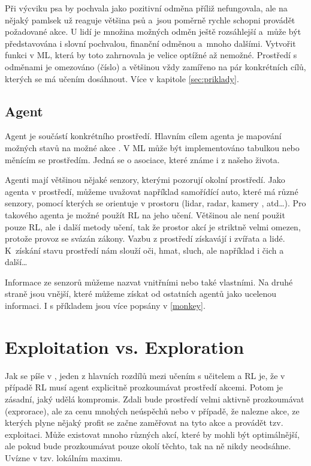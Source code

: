 \documentclass{article}
\begin{document}
Při výcviku psa by pochvala jako pozitivní odměna příliž nefungovala, ale na nějaký pamlsek už reaguje většina psů a~jsou poměrně rychle schopni provádět požadované akce. U lidí je množina možných odměn ještě rozsáhlejší a~může být představována i slovní pochvalou, finanční odměnou a~mnoho dalšími. Vytvořit funkci v ML, která by toto zahrnovala je velice optížné až nemožné. Prostředí s odměnami je omezováno (číslo) a většinou vždy zamířeno na pár konkrétních cílů, kterých se má učením dosáhnout. Více v kapitole \ref{sec:priklady}.


\subsection{Agent}
\label{agent}
Agent je součástí konkrétního prostředí. Hlavním cílem agenta je mapování možných stavů na možné akce \cite{sutton1999reinforcement}. V ML může být implementováno tabulkou nebo měnícím se prostředím. Jedná se o asociace, které známe i z našeho života. 

Agenti mají většinou nějaké senzory, kterými pozorují okolní prostředí. Jako agenta v prostředí, můžeme uvažovat například samořídící auto, které má různé senzory, pomocí kterých se orientuje v prostoru (lidar, radar, kamery , atd\dots). Pro takového agenta je možné použít RL na jeho učení. Většinou ale není použit pouze RL, ale i další metody učení, tak že prostor akcí je striktně velmi omezen, protože provoz se svázán zákony. Vazbu z  prostředí získavájí i zvířata a lidé. K~získání stavu prostředí nám slouží oči, hmat, sluch, ale například i čich a další\dots 

Informace ze senzorů můžeme nazvat vnitřními nebo také vlastními. Na druhé straně jsou vnější, které můžeme získat od ostatních agentů jako ucelenou informaci. I s příkladem jsou více popsány v \ref{monkey}.


\section{Exploitation vs. Exploration}
Jak se píše v \cite{kaelbling1996reinforcement}, jeden z hlavních rozdílů mezi učením s učitelem a RL je, že v případě RL musí agent explicitně prozkoumávat prostředí akcemi. Potom je zásadní, jaký udělá kompromis. Zdali bude prostředí velmi aktivně prozkoumávat (exprorace), ale za cenu mnohých neúspěchů nebo v případě, že nalezne akce, ze kterých plyne nějaký profit se začne zaměřovat na tyto akce a provádět tzv. exploitaci. Může existovat mnoho různých akcí, které by mohli být optimálnější, ale pokud bude prozkoumávat pouze okolí těchto, tak na ně nikdy neodsáhne. Uvízne v tzv. lokálním maximu.
\end{document}
